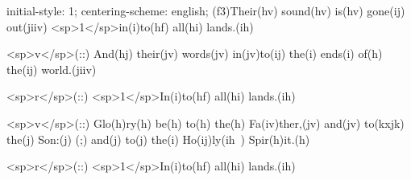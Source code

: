 initial-style: 1;
centering-scheme: english;
(f3)Their(hv) sound(hv) is(hv) gone(ij) out(jiiv) <sp>1</sp>in(i)to(hf) all(hi) lands.(ih)

<sp>v</sp>(::) And(hj) their(jv) words(jv) in(jv)to(ij) the(i) ends(i) of(h) the(ij) world.(jiiv)

<sp>r</sp>(::) <sp>1</sp>In(i)to(hf) all(hi) lands.(ih)

<sp>v</sp>(::) Glo(h)ry(h) be(h) to(h) the(h) Fa(iv)ther,(jv) and(jv) to(kxjk) the(j) Son:(j) (;) and(j) to(j) the(i) Ho(ij)ly(ih~) Spir(h)it.(h)

<sp>r</sp>(::) <sp>1</sp>In(i)to(hf) all(hi) lands.(ih)